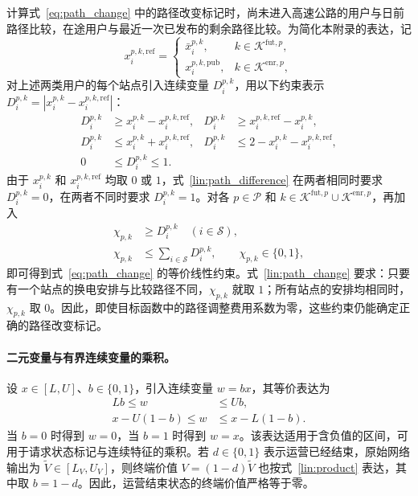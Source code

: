 计算式~\eqref{eq:path_change} 中的路径改变标记时，尚未进入高速公路的用户与日前路径比较，在途用户与最近一次已发布的剩余路径比较。为简化本附录的表达，记
\begin{equation}
x_i^{p,k,\mathrm{ref}}=
\begin{cases}
\bar x_i^{p,k}, & k\in\mathcal K^{\mathrm{fut},p},\\
x_i^{p,k,\mathrm{pub}}, & k\in\mathcal K^{\mathrm{enr},p},
\end{cases}
\label{lin:path_reference}
\end{equation}
对上述两类用户的每个站点引入连续变量 $D_i^{p,k}$，用以下约束表示 $D_i^{p,k}=|x_i^{p,k}-x_i^{p,k,\mathrm{ref}}|$：
\begin{equation}
\begin{aligned}
D_i^{p,k}&\ge x_i^{p,k}-x_i^{p,k,\mathrm{ref}},&
D_i^{p,k}&\ge x_i^{p,k,\mathrm{ref}}-x_i^{p,k},\\
D_i^{p,k}&\le x_i^{p,k}+x_i^{p,k,\mathrm{ref}},&
D_i^{p,k}&\le 2-x_i^{p,k}-x_i^{p,k,\mathrm{ref}},\\
0&\le D_i^{p,k}\le1.
\end{aligned}
\label{lin:path_difference}
\end{equation}
由于 $x_i^{p,k}$ 和 $x_i^{p,k,\mathrm{ref}}$ 均取 $0$ 或 $1$，式~\eqref{lin:path_difference} 在两者相同时要求 $D_i^{p,k}=0$，在两者不同时要求 $D_i^{p,k}=1$。对各 $p\in\mathcal P$ 和 $k\in\mathcal K^{\mathrm{fut},p}\cup\mathcal K^{\mathrm{enr},p}$，再加入
\begin{equation}
\begin{aligned}
\chi_{p,k}&\ge D_i^{p,k}\quad(i\in\mathcal S),\\
\chi_{p,k}&\le\sum_{i\in\mathcal S}D_i^{p,k},
\qquad \chi_{p,k}\in\{0,1\},
\end{aligned}
\label{lin:path_change}
\end{equation}
即可得到式~\eqref{eq:path_change} 的等价线性约束。式~\eqref{lin:path_change} 要求：只要有一个站点的换电安排与比较路径不同，$\chi_{p,k}$ 就取 $1$；所有站点的安排均相同时，$\chi_{p,k}$ 取 $0$。因此，即使目标函数中的路径调整费用系数为零，这些约束仍能确定正确的路径改变标记。

\paragraph{二元变量与有界连续变量的乘积。}
设 $x\in[L,U]$、$b\in\{0,1\}$，引入连续变量 $w=bx$，其等价表达为
\begin{equation}
\begin{aligned}
Lb\le w&\le Ub,\\
x-U(1-b)\le w&\le x-L(1-b).
\end{aligned}
\label{lin:product}
\end{equation}
当 $b=0$ 时得到 $w=0$，当 $b=1$ 时得到 $w=x$。该表达适用于含负值的区间，可用于请求状态标记与连续特征的乘积。若 $d\in\{0,1\}$ 表示运营已经结束，原始网络输出为 $\widetilde V\in[L_V,U_V]$，则终端价值 $V=(1-d)\widetilde V$ 也按式~\eqref{lin:product} 表达，其中取 $b=1-d$。因此，运营结束状态的终端价值严格等于零。

